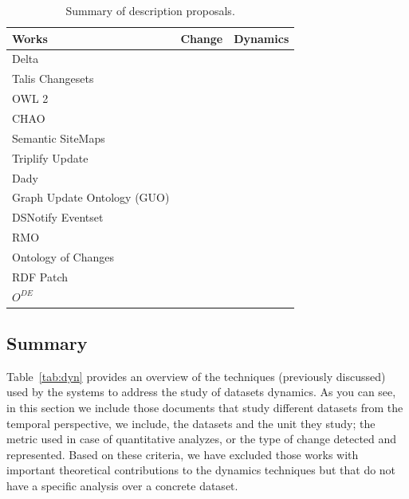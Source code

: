 \documentclass[sw]{iosart2x}
\newcommand{\cmark}{\ding{51}}%
\begin{document}
\begin{table}[htbp]
	\centering
	\caption{Summary of description proposals.}
	\begin{tabular}{lcc}
		\hline
		Works & Change & Dynamics \\ \hline
		Delta \cite{Berners04} & \cmark   & \\
		Talis Changesets \cite{TunnicliffeD09} & \cmark   & \\		
		OWL 2 \cite{PalmaHCG08} & \cmark   &  \\
		CHAO \cite{NoyCLM06} & \cmark   & \\	
		Semantic SiteMaps \cite{CyganiakSDDT08} &    & \cmark \\
		Triplify Update \cite{AuerDLHA09} & \cmark   & \\	
		Dady \cite{Dady10} &    & \cmark \\
		Graph Update Ontology (GUO)\footnotemark	 & \cmark   &  \\
		DSNotify Eventset \cite{PopitschH11} & \cmark   & \\		
		RMO \cite{GraubeHU14} & \cmark   &  \\	
		Ontology of Changes \cite{RoussakisCSFS15} & \cmark   &  \\
		RDF Patch\footnotemark  & \cmark   &  \\ 
		$O^{DE}$ \cite{PernelleSMT16} & \cmark   &  \\ 
		\hline
	\end{tabular}%
	\label{tab:vocab}%
\end{table}%



\subsection{Summary}\label{Summary1}

Table~\ref{tab:dyn} provides an overview of the techniques (previously discussed) used by the systems to address the study of datasets dynamics. As you can see, in this section we include those documents that study different datasets from the temporal perspective, we include, the datasets and the unit they study; the metric used in case of quantitative analyzes, or the type of change detected and represented. Based on these criteria, we have excluded those works with important theoretical contributions to the dynamics techniques but that do not have a specific analysis over a concrete dataset.
\end{document}
